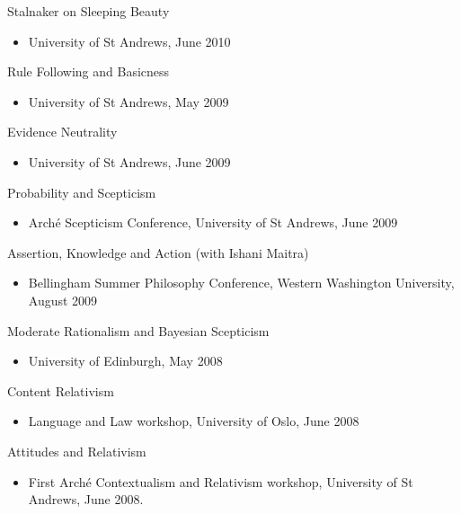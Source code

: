 \documentclass[
  10pt,
  letterpaper,
  DIV=11,
  numbers=noendperiod,
  twoside]{scrartcl}
\providecommand{\tightlist}{%
  \setlength{\itemsep}{0pt}\setlength{\parskip}{0pt}}\usepackage{longtable,booktabs,array}
\begin{document}
Stalnaker on Sleeping Beauty

\begin{itemize}
\tightlist
\item
  University of St Andrews, June 2010
\end{itemize}

Rule Following and Basicness

\begin{itemize}
\tightlist
\item
  University of St Andrews, May 2009
\end{itemize}

Evidence Neutrality

\begin{itemize}
\tightlist
\item
  University of St Andrews, June 2009
\end{itemize}

Probability and Scepticism

\begin{itemize}
\tightlist
\item
  Arché Scepticism Conference, University of St Andrews, June 2009
\end{itemize}

Assertion, Knowledge and Action (with Ishani Maitra)

\begin{itemize}
\tightlist
\item
  Bellingham Summer Philosophy Conference, Western Washington
  University, August 2009
\end{itemize}

Moderate Rationalism and Bayesian Scepticism

\begin{itemize}
\tightlist
\item
  University of Edinburgh, May 2008
\end{itemize}

Content Relativism

\begin{itemize}
\tightlist
\item
  Language and Law workshop, University of Oslo, June 2008
\end{itemize}

Attitudes and Relativism

\begin{itemize}
\tightlist
\item
  First Arché Contextualism and Relativism workshop, University of St
  Andrews, June 2008.
\end{itemize}
\end{document}
